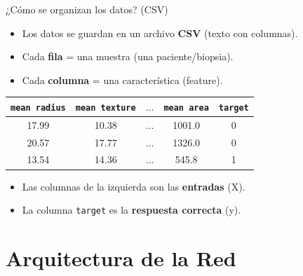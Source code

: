 \documentclass[10pt,aspectratio=169]{beamer}
\begin{document}
\begin{frame}{¿Cómo se organizan los datos? (CSV)}
  \begin{itemize}
    \item Los datos se guardan en un archivo \textbf{CSV} (texto con columnas).
    \item Cada \textbf{fila} = una muestra (una paciente/biopsia).
    \item Cada \textbf{columna} = una característica (feature).
  \end{itemize}

  \begin{center}
    \begin{tabular}{ccccc}
      \toprule
      \texttt{mean radius} & \texttt{mean texture} & $\dots$ & \texttt{mean area} & \texttt{target} \\
      \midrule
      17.99 & 10.38 & $\dots$ & 1001.0 & 0 \\
      20.57 & 17.77 & $\dots$ & 1326.0 & 0 \\
      13.54 & 14.36 & $\dots$ & 545.8 & 1 \\
      \bottomrule
    \end{tabular}
  \end{center}

  \pause
  \begin{itemize}
    \item Las columnas de la izquierda son las \textbf{entradas} (X).
    \item La columna \texttt{target} es la \textbf{respuesta correcta} (y).
  \end{itemize}
\end{frame}

\section{Arquitectura de la Red}
\end{document}
